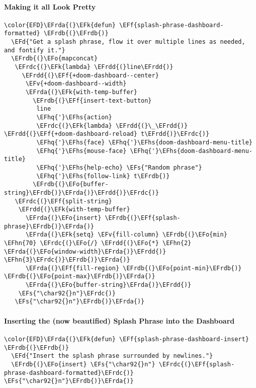 \documentclass{article}
\newcommand{\EFs}[1]{\textcolor{EFs}{#1}} %
\newcommand{\EFd}[1]{\textcolor{EFd}{#1}} %
\newcommand{\EFk}[1]{\textcolor{EFk}{#1}} %
\newcommand{\EFf}[1]{\textcolor{EFf}{#1}} %
\newcommand{\EFv}[1]{\textcolor{EFv}{#1}} %
\newcommand{\EFo}[1]{\textcolor{EFo}{#1}} %
\newcommand{\EFhn}[1]{\textcolor{EFhn}{\textbf{#1}}} %
\newcommand{\EFhq}[1]{#1} %
\newcommand{\EFhs}[1]{\textcolor{EFhs}{#1}} %
\newcommand{\EFrda}[1]{\textcolor{EFrda}{#1}} %
\newcommand{\EFrdb}[1]{\textcolor{EFrdb}{#1}} %
\newcommand{\EFrdc}[1]{\textcolor{EFrdc}{#1}} %
\newcommand{\EFrdd}[1]{\textcolor{EFrdd}{#1}} %
\begin{document}
\paragraph{Making it all Look Pretty}
\label{sec:orgbae83bc}
\begin{Code}
\begin{Verbatim}
\color{EFD}\EFrda{(}\EFk{defun} \EFf{splash-phrase-dashboard-formatted} \EFrdb{(}\EFrdb{)}
  \EFd{"Get a splash phrase, flow it over multiple lines as needed, and fontify it."}
  \EFrdb{(}\EFo{mapconcat}
   \EFrdc{(}\EFk{lambda} \EFrdd{(}line\EFrdd{)}
     \EFrdd{(}\EFf{+doom-dashboard--center}
      \EFv{+doom-dashboard--width}
      \EFrda{(}\EFk{with-temp-buffer}
        \EFrdb{(}\EFf{insert-text-button}
         line
         \EFhq{'}\EFhs{action}
         \EFrdc{(}\EFk{lambda} \EFrdd{(}\_\EFrdd{)} \EFrdd{(}\EFf{+doom-dashboard-reload} t\EFrdd{)}\EFrdc{)}
         \EFhq{'}\EFhs{face} \EFhq{'}\EFhs{doom-dashboard-menu-title}
         \EFhq{'}\EFhs{mouse-face} \EFhq{'}\EFhs{doom-dashboard-menu-title}
         \EFhq{'}\EFhs{help-echo} \EFs{"Random phrase"}
         \EFhq{'}\EFhs{follow-link} t\EFrdb{)}
        \EFrdb{(}\EFo{buffer-string}\EFrdb{)}\EFrda{)}\EFrdd{)}\EFrdc{)}
   \EFrdc{(}\EFf{split-string}
    \EFrdd{(}\EFk{with-temp-buffer}
      \EFrda{(}\EFo{insert} \EFrdb{(}\EFf{splash-phrase}\EFrdb{)}\EFrda{)}
      \EFrda{(}\EFk{setq} \EFv{fill-column} \EFrdb{(}\EFo{min} \EFhn{70} \EFrdc{(}\EFo{/} \EFrdd{(}\EFo{*} \EFhn{2} \EFrda{(}\EFo{window-width}\EFrda{)}\EFrdd{)} \EFhn{3}\EFrdc{)}\EFrdb{)}\EFrda{)}
      \EFrda{(}\EFf{fill-region} \EFrdb{(}\EFo{point-min}\EFrdb{)} \EFrdb{(}\EFo{point-max}\EFrdb{)}\EFrda{)}
      \EFrda{(}\EFo{buffer-string}\EFrda{)}\EFrdd{)}
    \EFs{"\char92{}n"}\EFrdc{)}
   \EFs{"\char92{}n"}\EFrdb{)}\EFrda{)}
\end{Verbatim}
\end{Code}
\paragraph{Inserting the (now beautified) Splash Phrase into the Dashboard}
\label{sec:org67a0c22}
\begin{Code}
\begin{Verbatim}
\color{EFD}\EFrda{(}\EFk{defun} \EFf{splash-phrase-dashboard-insert} \EFrdb{(}\EFrdb{)}
  \EFd{"Insert the splash phrase surrounded by newlines."}
  \EFrdb{(}\EFo{insert} \EFs{"\char92{}n"} \EFrdc{(}\EFf{splash-phrase-dashboard-formatted}\EFrdc{)} \EFs{"\char92{}n"}\EFrdb{)}\EFrda{)}
\end{Verbatim}
\end{Code}
\end{document}

